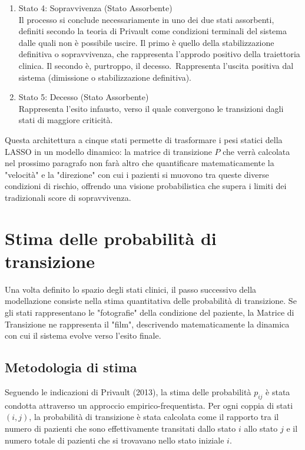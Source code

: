 \documentclass[11pt, oneside, noexaminfo]{sapthesis}   	%
\begin{document}
\begin{enumerate}
\item {Stato 4: Sopravvivenza (Stato Assorbente)} \\ 
Il processo si conclude necessariamente in uno dei due stati assorbenti, definiti secondo la teoria di Privault come condizioni terminali del sistema dalle quali non è possibile uscire. Il primo è quello della stabilizzazione definitiva o sopravvivenza, che rappresenta l'approdo positivo della traiettoria clinica. Il secondo è, purtroppo, il decesso.\
Rappresenta l'uscita positiva dal sistema (dimissione o stabilizzazione definitiva).

\item {Stato 5: Decesso (Stato Assorbente)} \\ 
Rappresenta l'esito infausto, verso il quale convergono le transizioni dagli stati di maggiore criticità.
\end{enumerate}

Questa architettura a cinque stati permette di trasformare i pesi statici della LASSO in un modello dinamico: la matrice di transizione $P$ che verrà calcolata nel prossimo paragrafo non farà altro che quantificare matematicamente la "velocità" e la "direzione" con cui i pazienti si muovono tra queste diverse condizioni di rischio, offrendo una visione probabilistica che supera i limiti dei tradizionali score di sopravvivenza.

\section{Stima delle probabilità di transizione}
Una volta definito lo spazio degli stati clinici, il passo successivo della modellazione consiste nella stima quantitativa delle probabilità di transizione. Se gli stati rappresentano le "fotografie" della condizione del paziente, la Matrice di Transizione ne rappresenta il "film", descrivendo matematicamente la dinamica con cui il sistema evolve verso l'esito finale.

\subsection{Metodologia di stima}
Seguendo le indicazioni di Privault (2013), la stima delle probabilità $p_{ij}$ è stata condotta attraverso un approccio empirico-frequentista. Per ogni coppia di stati $(i,j)$, la probabilità di transizione è stata calcolata come il rapporto tra il numero di pazienti che sono effettivamente transitati dallo stato $i$ allo stato $j$ e il numero totale di pazienti che si trovavano nello stato iniziale $i$.
\end{document}
